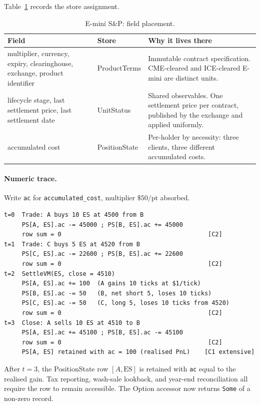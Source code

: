 \documentclass[11pt,a4paper]{article}
\begin{document}
Table~\ref{tab:future-fields} records the store assignment.

\begin{longtable}{p{5.8cm}p{3.2cm}p{6cm}}
\caption{E-mini S\&P: field placement.}\label{tab:future-fields}\\
\toprule
\textbf{Field} & \textbf{Store} & \textbf{Why it lives there} \\
\midrule
multiplier, currency, expiry, clearinghouse, exchange, product identifier & ProductTerms & Immutable contract specification. CME-cleared and ICE-cleared E-mini are distinct units. \\
\addlinespace
lifecycle stage, last settlement price, last settlement date & UnitStatus & Shared observables. One settlement price per contract, published by the exchange and applied uniformly. \\
\addlinespace
accumulated cost & PositionState & Per-holder by necessity: three clients, three different accumulated costs. \\
\bottomrule
\end{longtable}

\paragraph{Numeric trace.} Write \texttt{ac} for \texttt{accumulated\_cost}, multiplier $\$50/\mathrm{pt}$ absorbed.

\begin{lstlisting}
t=0  Trade: A buys 10 ES at 4500 from B
     PS[A, ES].ac -= 45000 ; PS[B, ES].ac += 45000
     row sum = 0                                         [C2]
t=1  Trade: C buys 5 ES at 4520 from B
     PS[C, ES].ac -= 22600 ; PS[B, ES].ac += 22600
     row sum = 0                                         [C2]
t=2  SettleVM(ES, close = 4510)
     PS[A, ES].ac += 100  (A gains 10 ticks at $1/tick)
     PS[B, ES].ac -= 50   (B, net short 5, loses 10 ticks)
     PS[C, ES].ac -= 50   (C, long 5, loses 10 ticks from 4520)
     row sum = 0                                         [C2]
t=3  Close: A sells 10 ES at 4510 to B
     PS[A, ES].ac += 45100 ; PS[B, ES].ac -= 45100
     row sum = 0                                         [C2]
     PS[A, ES] retained with ac = 100 (realised PnL)    [C1 extensive]
\end{lstlisting}

\noindent After $t{=}3$, the PositionState row $[A, \mathrm{ES}]$ is retained with \texttt{ac} equal to the realised gain. Tax reporting, wash-sale lookback, and year-end reconciliation all require the row to remain accessible. The Option accessor now returns \texttt{Some} of a non-zero record.
\end{document}
